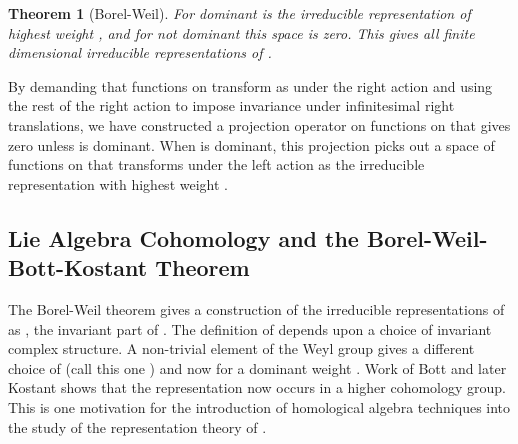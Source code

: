 \documentclass[a4paper,a4paper]{article}
\newtheorem{theorem}{Theorem}
\theoremstyle{conjecture}
\begin{document}
\begin{theorem}[Borel-Weil]
For \myHighlight{$\lambda$}\coordHE{} dominant \coordHE{} is the irreducible \coordHE{} representation \coordHE{}
of highest weight \myHighlight{$\lambda$}\coordHE{}, and for \myHighlight{$\lambda$}\coordHE{} not dominant this
space is zero.  This gives all finite dimensional irreducible
representations of \coordHE{}.
\end{theorem}

By demanding that functions on \coordHE{} transform as \myHighlight{$\lambda$}\coordHE{} under
the right \coordHE{} action and using the rest of the right \coordHE{} action to
impose invariance under infinitesimal right \coordHE{}
translations, we have constructed a projection operator on
functions on \coordHE{} that gives zero unless \myHighlight{$\lambda$}\coordHE{} is dominant.
When \myHighlight{$\lambda$}\coordHE{} is dominant, this projection picks out a space of
functions on \coordHE{} that transforms under the left \coordHE{} action as the
irreducible representation with highest weight \myHighlight{$\lambda$}\coordHE{}.


\subsection{Lie Algebra Cohomology and the Borel-Weil-Bott-Kostant Theorem}

The Borel-Weil theorem gives a construction of the irreducible
representations of \coordHE{} as \coordHE{},
the \coordHE{} invariant part of \coordHE{}.  The
definition of \coordHE{} depends upon a choice of
invariant complex structure. A non-trivial element \coordHE{} of the Weyl
group \coordHE{} gives a different choice of \coordHE{} (call
this one \coordHE{}) and now
\coordHE{} for a dominant weight
\myHighlight{$\lambda$}\coordHE{}.  Work of Bott \cite{Bott1} and later
Kostant \cite{Kostant1} shows that the representation now occurs in
a higher cohomology group.  This is one motivation for the
introduction of homological algebra techniques into the study of
the representation theory of \coordHE{}.
\end{document}
